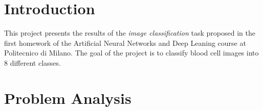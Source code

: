 \documentclass[11pt]{article}
\begin{document}
\begin{multicols}{2}

      \section{Introduction}


      This project presents the results of the \textit{image classification}
      task
      proposed in the first homework of the Artificial Neural Networks and Deep
      Leaning course at Politecnico di Milano. The goal of the project is to
      classify blood cell images into 8 different classes.

      \section{Problem Analysis}


\end{multicols}
\end{document}
